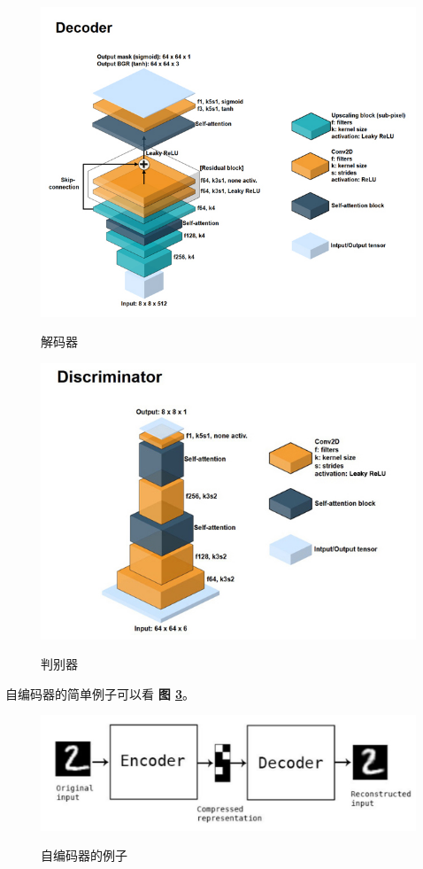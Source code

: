 \begin{figure}[h!]
	\caption{解码器}
	\centering
	\includegraphics[width=\textwidth]{decode.jpg}
	\label{fig:decode}
\end{figure}

\begin{figure}[h!]
	\caption{判别器}
	\centering
	\includegraphics[width=\textwidth]{disc.jpg}
	\label{fig:disc}
\end{figure}

自编码器的简单例子可以看 \textbf{图 \ref{fig:encode_decode}}。

\begin{figure}[h!]
	\caption{自编码器的例子}
	\centering
	\includegraphics[width=\textwidth]{encode_decode.jpg}
	\label{fig:encode_decode}
\end{figure}

